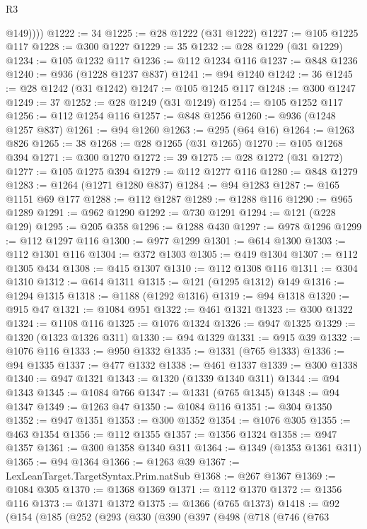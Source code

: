 \begin{lexlean}{R3}
\begin{coremodule}
            @149))))
@1222 := 34
@1225 := @28 @1222 (@31 @1222)
@1227 := @105 @1225 @117
@1228 := @300 @1227
@1229 := 35
@1232 := @28 @1229 (@31 @1229)
@1234 := @105 @1232 @117
@1236 := @112 @1234 @116
@1237 := @848 @1236
@1240 := @936 (@1228 @1237 @837)
@1241 := @94 @1240
@1242 := 36
@1245 := @28 @1242 (@31 @1242)
@1247 := @105 @1245 @117
@1248 := @300 @1247
@1249 := 37
@1252 := @28 @1249 (@31 @1249)
@1254 := @105 @1252 @117
@1256 := @112 @1254 @116
@1257 := @848 @1256
@1260 := @936 (@1248 @1257 @837)
@1261 := @94 @1260
@1263 := @295 (@64 @16)
@1264 := @1263 @826
@1265 := 38
@1268 := @28 @1265 (@31 @1265)
@1270 := @105 @1268 @394
@1271 := @300 @1270
@1272 := 39
@1275 := @28 @1272 (@31 @1272)
@1277 := @105 @1275 @394
@1279 := @112 @1277 @116
@1280 := @848 @1279
@1283 := @1264 (@1271 @1280 @837)
@1284 := @94 @1283
@1287 := @165 @1151 @69 @177
@1288 := @112 @1287
@1289 := @1288 @116
@1290 := @965 @1289
@1291 := @962 @1290
@1292 := @730 @1291
@1294 := @121 (@228 @129)
@1295 := @205 @358
@1296 := @1288 @430
@1297 := @978 @1296
@1299 := @112 @1297 @116
@1300 := @977 @1299
@1301 := @614 @1300
@1303 := @112 @1301 @116
@1304 := @372 @1303
@1305 := @419 @1304
@1307 := @112 @1305 @434
@1308 := @415 @1307
@1310 := @112 @1308 @116
@1311 := @304 @1310
@1312 := @614 @1311
@1315 := @121 (@1295 @1312) @149
@1316 := @1294 @1315
@1318 := @1188 (@1292 @1316)
@1319 := @94 @1318
@1320 := @915 @47
@1321 := @1084 @951
@1322 := @461 @1321
@1323 := @300 @1322
@1324 := @1108 @116
@1325 := @1076 @1324
@1326 := @947 @1325
@1329 := @1320 (@1323 @1326 @311)
@1330 := @94 @1329
@1331 := @915 @39
@1332 := @1076 @116
@1333 := @950 @1332
@1335 := @1331 (@765 @1333)
@1336 := @94 @1335
@1337 := @477 @1332
@1338 := @461 @1337
@1339 := @300 @1338
@1340 := @947 @1321
@1343 := @1320 (@1339 @1340 @311)
@1344 := @94 @1343
@1345 := @1084 @766
@1347 := @1331 (@765 @1345)
@1348 := @94 @1347
@1349 := @1263 @47
@1350 := @1084 @116
@1351 := @304 @1350
@1352 := @947 @1351
@1353 := @300 @1352
@1354 := @1076 @305
@1355 := @463 @1354
@1356 := @112 @1355
@1357 := @1356 @1324
@1358 := @947 @1357
@1361 := @300 @1358 @1340 @311
@1364 := @1349 (@1353 @1361 @311)
@1365 := @94 @1364
@1366 := @1263 @39
@1367 := LexLeanTarget.TargetSyntax.Prim.natSub
@1368 := @267 @1367
@1369 := @1084 @305
@1370 := @1368 @1369
@1371 := @112 @1370
@1372 := @1356 @116
@1373 := @1371 @1372
@1375 := @1366 (@765 @1373)
@1418 := @92
    (@154
      (@185
        (@252
          (@293
            (@330
              (@390
                (@397
                  (@498
                    (@718
                      (@746
                        (@763

\end{coremodule}
\end{lexlean}
